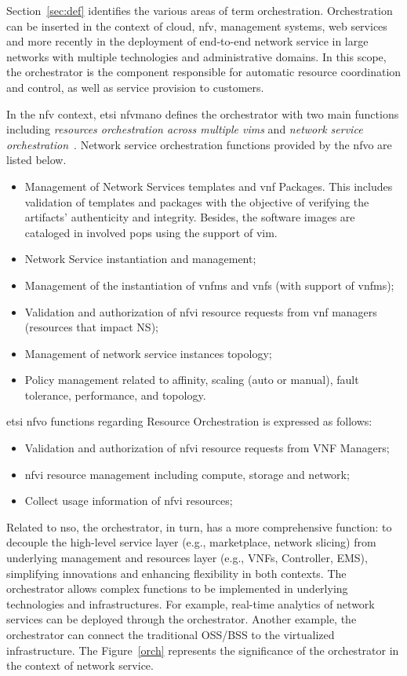 Section~\ref{sec:def} identifies the various areas of term orchestration. Orchestration can be inserted in the context of cloud, \gls{nfv}, management systems, web services and more recently in the deployment of end-to-end network service in large networks with multiple technologies and administrative domains. In this scope, the orchestrator is the component responsible for automatic resource coordination and control, as well as service provision to customers. 

In the \gls{nfv} context, \gls{etsi} \gls{nfvmano} defines the orchestrator with two main functions including \textit{resources orchestration across multiple \glspl{vim}} and \textit{network service orchestration}~\cite{GSNFV-MAN001:2014}. Network service orchestration functions provided by the \gls{nfvo} are listed below.
\begin{itemize}
\item Management of Network Services templates and \gls{vnf} Packages. This includes validation of templates and packages with the objective of verifying the artifacts' authenticity and integrity. Besides, the software images are cataloged in involved \glspl{pop} using the support of \gls{vim}.
\item Network Service instantiation and management;
\item Management of the instantiation of \glspl{vnfm} and \glspl{vnf} (with support of \glspl{vnfm});
\item Validation and authorization of \gls{nfvi} resource requests from \gls{vnf} managers (resources that impact NS);
\item Management of network service instances topology;
\item Policy management related to affinity, scaling (auto or manual), fault tolerance, performance, and topology.
\end{itemize}

\gls{etsi} \gls{nfvo} functions regarding Resource Orchestration is expressed as follows:
\begin{itemize}
\item Validation and authorization of \gls{nfvi} resource requests from VNF Managers;
\item \gls{nfvi} resource management including compute, storage and network;
\item Collect usage information of \gls{nfvi} resources;
\end{itemize}

Related to \gls{nso}, the orchestrator, in turn, has a  more comprehensive function: to decouple the high-level service layer (e.g., marketplace, network slicing) from underlying management and resources layer (e.g., VNFs, Controller, EMS), simplifying innovations and enhancing flexibility in both contexts. The orchestrator allows complex functions to be implemented in underlying technologies and infrastructures. For example, real-time analytics of network services can be deployed through the orchestrator. Another example, the orchestrator can connect the traditional OSS/BSS to the virtualized infrastructure. The Figure~\ref{orch} represents the significance of the orchestrator in the context of network service.  

